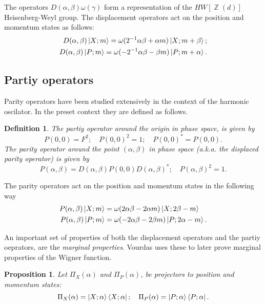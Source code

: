 \documentclass[a4paper]{article}
\DeclareMathOperator{\Z}{\mathbb{Z}}
\newtheorem{definition}{Definition}
\newtheorem{proposition}{Proposition}
\begin{document}
  The operators $D(\alpha,\beta)\omega(\gamma)$ form a
  representation of the $HW[\Z(d)]$ Heisenberg-Weyl group.
  The displacement operators act on the position and
  momentum states as follows:
  \begin{align*}
    D(\alpha,\beta) \ket{X; m}
    = \omega(2^{-1}\alpha\beta + \alpha m) \ket{X;
    m+\beta};\\
    D(\alpha,\beta) \ket{P; m}
    = \omega(-2^{-1}\alpha\beta - \beta m) \ket{P; m+\alpha}
  .\end{align*}

  \subsection{Partiy operators}

  Parity operators have been studied extensively in the
  context of the harmonic oscilator. In the preset context
  they are defined as follows.

  \begin{definition}
    The partiy operator around the origin in phase space, is
    given by
    \[
      P(0,0) = F^2;
      \quad
      P(0,0)^2 = 1;
      \quad
      P(0,0)^{*} = P(0,0).
    \] 
    The parity operator around the point $(\alpha,\beta)$ in
    phase space (a.k.a. the displaced parity operator) is
    given by
    \[
      P(\alpha,\beta)
      = D(\alpha,\beta) P(0,0) D(\alpha,\beta)^{*};
      \quad
      P(\alpha,\beta)^2 = 1.
    \] 
  \end{definition}

  The parity operators act on the position and momentum
  states in the following way
  \begin{align*}
    P(\alpha,\beta) \ket{X; m}
    &=
    \omega(2\alpha\beta - 2\alpha m) \ket{X; 2\beta - m}\\
    P(\alpha,\beta) \ket{P; m}
    &= 
    \omega(-2\alpha\beta-2\beta m) \ket{P; 2\alpha - m}.
  \end{align*}

  An important set of properties of both the displacement
  operators and the partiy oeprators, are the
  \textit{marginal properties}. Vourdas uses these to later
  prove marginal properties of the Wigner function.

  \begin{proposition}
    Let $\Pi_X(\alpha)$ and $\Pi_P(\alpha)$, be projectors
    to position and momentum states:
    \[
      \Pi_X(\alpha) = \ket{X; \alpha} \bra{X; \alpha};
      \quad
      \Pi_P(\alpha) = \ket{P; \alpha} \bra{P; \alpha}.
    \] 
  \end{proposition}
\end{document}
